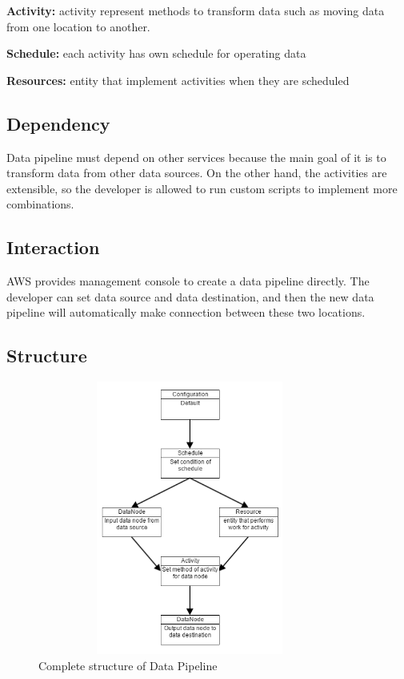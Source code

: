      \noindent\textbf{Activity:} activity represent methods to transform data such as moving data from one location to another. 
     
     \noindent\textbf{Schedule:} each activity has own schedule for operating data
     
     \noindent\textbf{Resources:} entity that implement activities when they are scheduled 
     
	\subsection{Dependency}
     Data pipeline must depend on other services because the main goal of it is to transform data from other data sources. On the other hand, the activities are extensible, so the developer is allowed to run custom scripts to implement more combinations.
    
	\subsection{Interaction}
	AWS provides management console to create a data pipeline directly. The developer can set data source and data destination, and then the new data pipeline will automatically make connection between these two locations.  
    
	\subsection{Structure}
    \begin{figure}[h]
        \includegraphics[width=10cm, height=9cm]{data_pipeline.png}
        \centering
        \caption{Complete structure of Data Pipeline}
    \end{figure}
    
